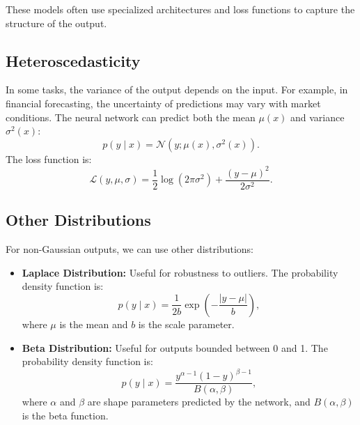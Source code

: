 \begin{notechapter}
These models often use specialized architectures and loss functions to capture the structure of the output.

\subsection{Heteroscedasticity}
In some tasks, the variance of the output depends on the input. For example, in financial forecasting, the uncertainty of predictions may vary with market conditions. The neural network can predict both the mean \( \mu(x) \) and variance \( \sigma^2(x) \):
\[
p(y \mid x) = \mathcal{N}(y; \mu(x), \sigma^2(x)).
\]
The loss function is:
\[
\mathcal{L}(y, \mu, \sigma) = \frac{1}{2} \log(2\pi\sigma^2) + \frac{(y - \mu)^2}{2\sigma^2}.
\]

\subsection{Other Distributions}
For non-Gaussian outputs, we can use other distributions:
\begin{itemize}
    \item \textbf{Laplace Distribution:} Useful for robustness to outliers. The probability density function is:
          \[
          p(y \mid x) = \frac{1}{2b} \exp\left(-\frac{|y - \mu|}{b}\right),
          \]
          where \( \mu \) is the mean and \( b \) is the scale parameter.
    \item \textbf{Beta Distribution:} Useful for outputs bounded between 0 and 1. The probability density function is:
          \[
          p(y \mid x) = \frac{y^{\alpha-1} (1-y)^{\beta-1}}{B(\alpha, \beta)},
          \]
          where \( \alpha \) and \( \beta \) are shape parameters predicted by the network, and \( B(\alpha, \beta) \) is the beta function.
\end{itemize}


\end{notechapter}
